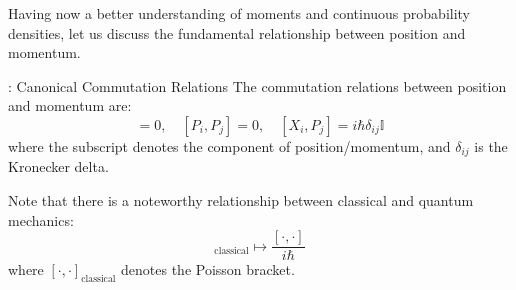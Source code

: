 Having now a better understanding of moments and continuous probability densities, let us discuss the fundamental relationship between position and momentum.

\begin{axiombox}{: Canonical Commutation Relations}
    The commutation relations between position and momentum are:
    \begin{equation}
        [X_i, X_j] = 0, \quad [P_i, P_j] = 0, \quad [X_i, P_j] = i\hbar\delta_{ij}\mathbb{I}
    \end{equation}
    where the subscript denotes the component of position/momentum, and $\delta_{ij}$ is the Kronecker delta.
\end{axiombox}
Note that there is a noteworthy relationship between classical and quantum mechanics:
\begin{equation}
    [\cdot, \cdot]_{\text{classical}} \mapsto \frac{[\cdot, \cdot]}{i\hbar}
\end{equation}
where $[\cdot, \cdot]_{\text{classical}}$ denotes the Poisson bracket.

